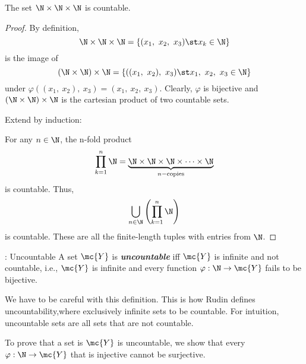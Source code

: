 \begin{claim}
	The set \(\N\times\N\times\N\) is countable.
\end{claim}
\begin{proof}
	By definition,
	\begin{equation*}
		\N\times\N\times\N=\{(x_1,~x_2,~x_3)\st x_k\in\N\}
	\end{equation*}
	is the image of 
	\begin{equation*}
		(\N\times\N)\times\N=\{((x_1,~x_2),~x_3)\st x_1,~x_2,~x_3\in\N\}
	\end{equation*}
	under \(\varphi((x_1,~x_2),~x_3)=(x_1,~x_2,~x_3)\). 
	Clearly, \(\varphi\) is bijective and \((\N\times\N)\times\N\) is the cartesian product of two countable sets.
	
	\medskip
	
	Extend by induction:
	
	\smallskip
	
	For any \(n\in\N\), the n-fold product
	\begin{equation*}
		\prod_{k=1}^{n}\N=\underbrace{\N\times\N\times\N\times\dots\times\N}_{n-\text{copies}}
	\end{equation*}
	is countable. Thus,
	\begin{equation*}
		\bigcup_{n\in\N}\left(\prod_{k=1}^{n}\N\right)
	\end{equation*}
	is countable. These are all the finite-length tuples with entries from \(\N\).
\end{proof}
\begin{ndef}{: Uncountable}
	A set \(\mc{Y}\) is \emph{\textbf{uncountable}} iff \(\mc{Y}\) is infinite and not countable, i.e., \(\mc{Y}\) is infinite and every function \(\varphi:\N\to \mc{Y}\) fails to be bijective.
\end{ndef}
\begin{note}
	We have to be careful with this definition. This is how Rudin defines uncountability,where exclusively infinite sets to be countable. For intuition, uncountable sets are all sets that are not countable.
\end{note}
\begin{note}
	To prove that a set is \(\mc{Y}\) is uncountable, we show that every \(\varphi:\N\to \mc{Y}\) that is injective cannot be surjective.
\end{note}
